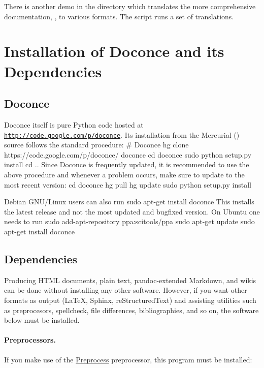 \documentclass[%
oneside,                 %
final,                   %
10pt]{article}
\begin{document}
There is another demo in the  directory which
translates the more comprehensive documentation, , to
various formats. The  script runs a set of translations.

\section{Installation of Doconce and its Dependencies}

\subsection{Doconce}

Doconce itself is pure Python code hosted at \href{{http://code.google.com/p/doconce}}{\nolinkurl{http://code.google.com/p/doconce}}.  Its installation from the
Mercurial () source follows the standard procedure:
\bsys
# Doconce
hg clone https://code.google.com/p/doconce/ doconce
cd doconce
sudo python setup.py install
cd ..
\esys
Since Doconce is frequently updated, it is recommended to use the
above procedure and whenever a problem occurs, make sure to
update to the most recent version:
\bsys
cd doconce
hg pull
hg update
sudo python setup.py install
\esys

Debian GNU/Linux users can also run
\bsys
sudo apt-get install doconce
\esys
This installs the latest release and not the most updated and bugfixed
version.
On Ubuntu one needs to run
\bsys
sudo add-apt-repository ppa:scitools/ppa
sudo apt-get update
sudo apt-get install doconce
\esys

\subsection{Dependencies}

Producing HTML documents, plain text, pandoc-extended Markdown,
and wikis can be done without installing any other
software. However, if you want other formats as output
({\LaTeX}, Sphinx, reStructuredText) and assisting utilities such
as preprocesors, spellcheck, file differences, bibliographies,
and so on, the software below must be installed.


\paragraph{Preprocessors.}
If you make use of the \href{{http://code.google.com/p/preprocess}}{Preprocess}
preprocessor, this program must be installed:
\end{document}
